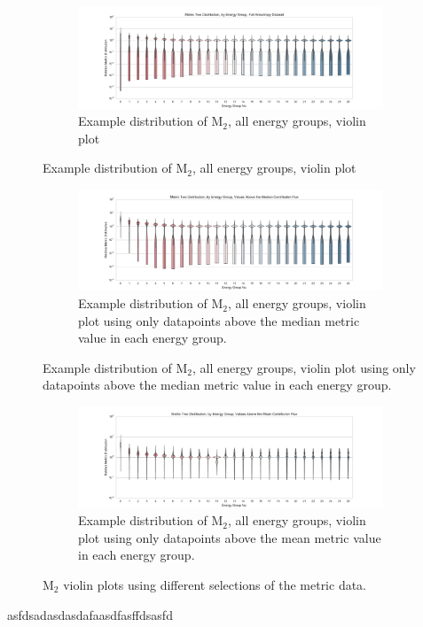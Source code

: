\begin{figure}[htb]
  \centering
  \begin{subfigure}[t]{\textwidth}
    \centering
    \includegraphics[width=\linewidth]{./chapters/characterization_probs/figures/sample_data/metric_two_violin_full.pdf}
    \caption{Example distribution of M$_2$, all energy groups, violin plot}
    \label{fig:samplefullviolinM2}
  \end{subfigure}
\end{figure}
\begin{figure}[htb]\ContinuedFloat
  \centering
  \begin{subfigure}[t]{\textwidth}
    \centering
    \includegraphics[width=\linewidth]{./chapters/characterization_probs/figures/sample_data/metric_two_violin_median.pdf}
    \caption{Example distribution of M$_2$, all energy groups, violin plot using
    only datapoints above the median metric value in each energy group.}
    \label{fig:samplemedianviolinM2}
  \end{subfigure}
\end{figure}
\begin{figure}[htb]\ContinuedFloat
  \centering
  \begin{subfigure}[t]{\textwidth}
    \centering
    \includegraphics[width=\linewidth]{./chapters/characterization_probs/figures/sample_data/metric_two_violin_mean.pdf}
    \caption{Example distribution of M$_2$, all energy groups, violin plot using
    only datapoints above the mean metric value in each energy group.}
    \label{fig:samplemeanviolinM2}
  \end{subfigure}
  \caption[M$_2$ violin plots using different selections of the metric data.]
  {M$_2$ violin plots using different selections of the metric data.}
  \label{fig:samplestrips}
\end{figure}
asfdsadasdasdafaasdfasffdsasfd


